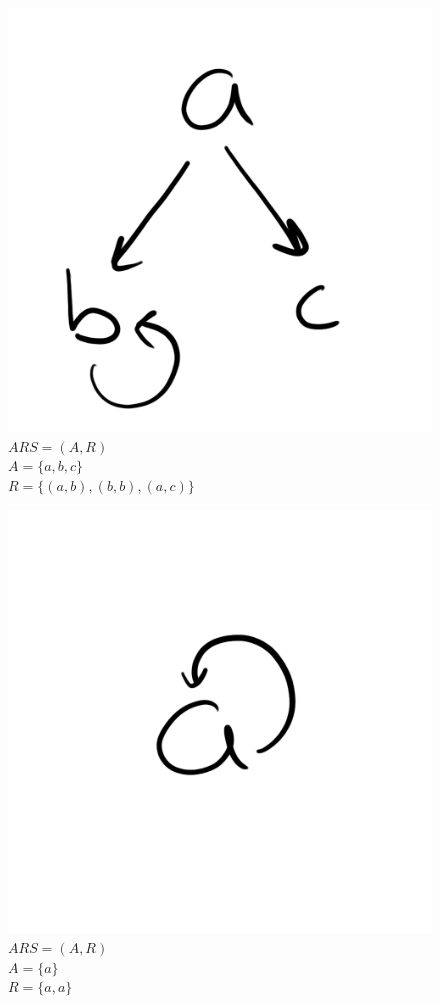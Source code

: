 \documentclass{article}
\begin{document}
\begin{figure}[H]
  \centering
  \includegraphics[scale=0.06]{gen7}
  \caption[] {
    $ARS = (A, R)$
    \\ $A=\{a, b, c\}$
    \\ $R=\{(a, b), (b, b), (a, c)\}$
    \endtabular}
\end{figure}

\begin{figure}[H]
  \centering
  \includegraphics[scale=0.06]{gen8}
  \caption[] {
    $ARS = (A, R)$
    \\ $A=\{a\}$
    \\ $R=\{a, a\}$
    \endtabular}
\end{figure}
\end{document}
